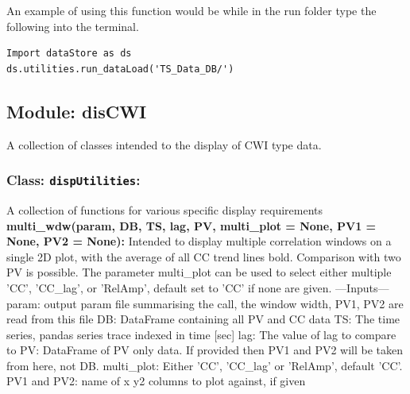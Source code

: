 \documentclass{article}
\begin{document}
  An example of using this function would be while in the run folder type the following into the terminal. 

\begin{lstlisting}[basicstyle=\small, frame=single]
Import dataStore as ds
ds.utilities.run_dataLoad('TS_Data_DB/')

\end{lstlisting}

	\subsection{Module: disCWI}
	A collection of classes intended to the display of CWI type data.
		\subsubsection{Class: \texttt{dispUtilities}:}
		A collection of functions for various specific display requirements  \newline
		\textbf{multi\_wdw(param, DB, TS, lag, PV, multi\_plot = None, PV1 = None, PV2 = None):} \newline
		Intended to display multiple correlation windows on a single 2D plot, with the average of all CC trend lines bold. Comparison with two PV is possible. The parameter multi\_plot can be used to select either multiple 'CC', 'CC\_lag', or 'RelAmp', default set to 'CC' if none are given. \newline
        ---Inputs--- \newline
        param: output param file summarising the call, the window width, PV1, PV2 are read from this file\newline
        DB: DataFrame containing all PV and CC data\newline
        TS: The time series, pandas series trace indexed in time [sec]\newline
        lag: The value of lag to compare to\newline
        PV: DataFrame of PV only data. If provided then PV1 and PV2 will be
            taken from here, not DB.\newline
        multi\_plot: Either 'CC', 'CC\_lag' or 'RelAmp', default 'CC'.\newline
        PV1 and PV2: name of x y2 columns to plot against, if given
        \newline
\end{document}
